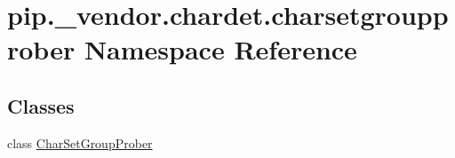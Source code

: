 \hypertarget{namespacepip_1_1__vendor_1_1chardet_1_1charsetgroupprober}{}\section{pip.\+\_\+vendor.\+chardet.\+charsetgroupprober Namespace Reference}
\label{namespacepip_1_1__vendor_1_1chardet_1_1charsetgroupprober}
\subsection*{Classes}
\begin{DoxyCompactItemize}
\item 
class \hyperlink{classpip_1_1__vendor_1_1chardet_1_1charsetgroupprober_1_1CharSetGroupProber}{Char\+Set\+Group\+Prober}
\end{DoxyCompactItemize}
